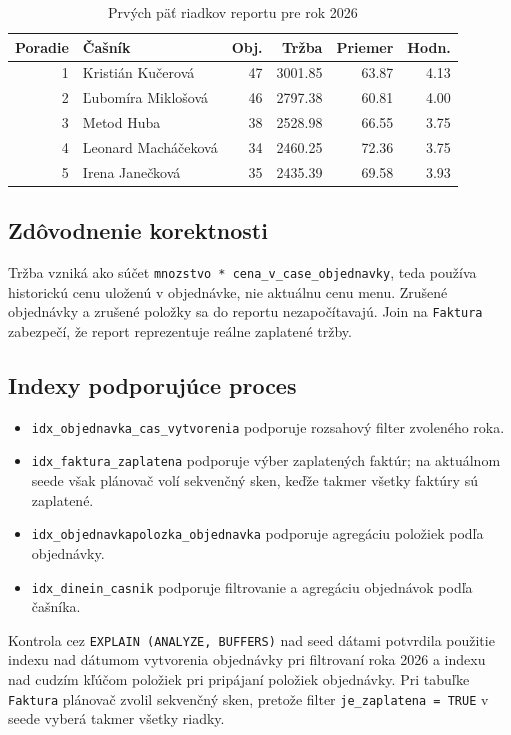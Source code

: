 \documentclass[11pt, a4paper]{article}
\begin{document}
\begin{table}[H]
\centering
\small
\begin{tabular}{rlrrrr}
\toprule
\textbf{Poradie} & \textbf{Čašník} & \textbf{Obj.} & \textbf{Tržba} & \textbf{Priemer} & \textbf{Hodn.} \\
\midrule
1 & Kristián Kučerová & 47 & 3001.85 & 63.87 & 4.13 \\
2 & Ľubomíra Miklošová & 46 & 2797.38 & 60.81 & 4.00 \\
3 & Metod Huba & 38 & 2528.98 & 66.55 & 3.75 \\
4 & Leonard Macháčeková & 34 & 2460.25 & 72.36 & 3.75 \\
5 & Irena Janečková & 35 & 2435.39 & 69.58 & 3.93 \\
\bottomrule
\end{tabular}
\caption{Prvých päť riadkov reportu pre rok 2026}
\end{table}

\subsection*{Zdôvodnenie korektnosti}

Tržba vzniká ako súčet \texttt{mnozstvo * cena\_v\_case\_objednavky}, teda používa historickú cenu
uloženú v objednávke, nie aktuálnu cenu menu. Zrušené objednávky a zrušené položky sa do reportu
nezapočítavajú. Join na \texttt{Faktura} zabezpečí, že report reprezentuje reálne zaplatené tržby.

\subsection*{Indexy podporujúce proces}

\begin{itemize}
    \item \texttt{idx\_objednavka\_cas\_vytvorenia} podporuje rozsahový filter zvoleného roka.
    \item \texttt{idx\_faktura\_zaplatena} podporuje výber zaplatených faktúr; na aktuálnom seede však plánovač volí sekvenčný sken, keďže takmer všetky faktúry sú zaplatené.
    \item \texttt{idx\_objednavkapolozka\_objednavka} podporuje agregáciu položiek podľa objednávky.
    \item \texttt{idx\_dinein\_casnik} podporuje filtrovanie a agregáciu objednávok podľa čašníka.
\end{itemize}

Kontrola cez \texttt{EXPLAIN (ANALYZE, BUFFERS)} nad seed dátami potvrdila použitie indexu nad
dátumom vytvorenia objednávky pri filtrovaní roka 2026 a indexu nad cudzím kľúčom položiek pri
pripájaní položiek objednávky. Pri tabuľke \texttt{Faktura} plánovač zvolil sekvenčný sken, pretože
filter \texttt{je\_zaplatena = TRUE} v seede vyberá takmer všetky riadky.
\end{document}
